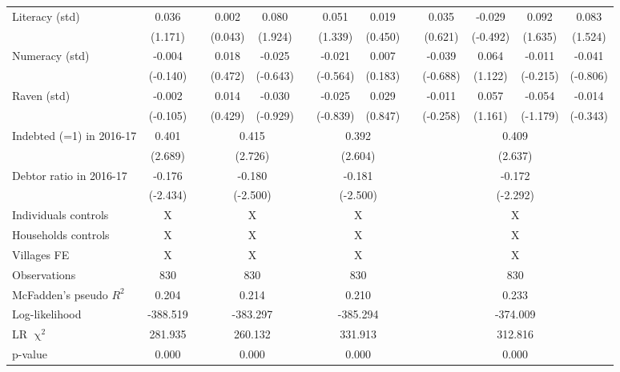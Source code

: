 \begin{table}[htbp]
{\begin{tabular}{lcccccccccccc}
    Literacy (std) & 0.036 &       & 0.002 & \cellcolor[rgb]{ 1,  1,  0}0.080 &       & 0.051 & 0.019 &       & 0.035 & -0.029 & 0.092 & 0.083 \\
          & (1.171) &       & (0.043) & (1.924) &       & (1.339) & (0.450) &       & (0.621) & (-0.492) & (1.635) & (1.524) \\
    Numeracy (std) & -0.004 &       & 0.018 & -0.025 &       & -0.021 & 0.007 &       & -0.039 & 0.064 & -0.011 & -0.041 \\
          & (-0.140) &       & (0.472) & (-0.643) &       & (-0.564) & (0.183) &       & (-0.688) & (1.122) & (-0.215) & (-0.806) \\
    Raven (std) & -0.002 &       & 0.014 & -0.030 &       & -0.025 & 0.029 &       & -0.011 & 0.057 & -0.054 & -0.014 \\
          & (-0.105) &       & (0.429) & (-0.929) &       & (-0.839) & (0.847) &       & (-0.258) & (1.161) & (-1.179) & (-0.343) \\
\cmidrule{1-2}\cmidrule{4-5}\cmidrule{7-8}\cmidrule{10-13}    Indebted (=1) in 2016-17 & 0.401 &       & \multicolumn{2}{c}{0.415} &       & \multicolumn{2}{c}{0.392} &       & \multicolumn{4}{c}{0.409} \\
          & (2.689) &       & \multicolumn{2}{c}{(2.726)} &       & \multicolumn{2}{c}{(2.604)} &       & \multicolumn{4}{c}{(2.637)} \\
    Debtor ratio in 2016-17 & -0.176 &       & \multicolumn{2}{c}{-0.180} &       & \multicolumn{2}{c}{-0.181} &       & \multicolumn{4}{c}{-0.172} \\
          & (-2.434) &       & \multicolumn{2}{c}{(-2.500)} &       & \multicolumn{2}{c}{(-2.500)} &       & \multicolumn{4}{c}{(-2.292)} \\
    Individuals controls & X     &       & \multicolumn{2}{c}{X} &       & \multicolumn{2}{c}{X} &       & \multicolumn{4}{c}{X} \\
    Households controls & X     &       & \multicolumn{2}{c}{X} &       & \multicolumn{2}{c}{X} &       & \multicolumn{4}{c}{X} \\
    Villages FE & X     &       & \multicolumn{2}{c}{X} &       & \multicolumn{2}{c}{X} &       & \multicolumn{4}{c}{X} \\
    \midrule
    Observations & 830   &       & \multicolumn{2}{c}{830} &       & \multicolumn{2}{c}{830} &       & \multicolumn{4}{c}{830} \\
    McFadden's pseudo $R^2$ & 0.204 &       & \multicolumn{2}{c}{0.214} &       & \multicolumn{2}{c}{0.210} &       & \multicolumn{4}{c}{0.233} \\
    Log-likelihood & -388.519 &       & \multicolumn{2}{c}{-383.297} &       & \multicolumn{2}{c}{-385.294} &       & \multicolumn{4}{c}{-374.009} \\
    LR $\upchi^2$ & 281.935 &       & \multicolumn{2}{c}{260.132} &       & \multicolumn{2}{c}{331.913} &       & \multicolumn{4}{c}{312.816} \\
    p-value & 0.000 &       & \multicolumn{2}{c}{0.000} &       & \multicolumn{2}{c}{0.000} &       & \multicolumn{4}{c}{0.000} \\
    \bottomrule


\end{tabular}}
\end{table}
